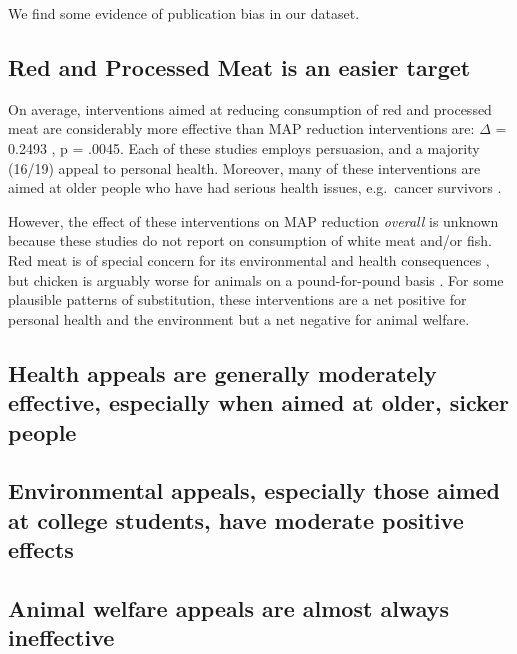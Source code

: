 \documentclass[sn-nature,pdflatex]{sn-jnl}
\begin{document}
We find some evidence of publication bias in our dataset.

\subsection{Red and Processed Meat is an easier
target}\label{red-and-processed-meat-is-an-easier-target}

On average, interventions aimed at reducing consumption of red and
processed meat are considerably more effective than MAP reduction
interventions are: \(\Delta\) = 0.2493 , p = .0045.
Each of these studies employs persuasion, and a majority (16/19) appeal
to personal health. Moreover, many of these interventions are aimed at
older people who have had serious health issues, e.g.~cancer survivors
\citep{lee2018, james2015}.

However, the effect of these interventions on MAP reduction
\emph{overall} is unknown because these studies do not report on
consumption of white meat and/or fish. Red meat is of special concern
for its environmental and health consequences \citep{grummon2023}, but
chicken is arguably worse for animals on a pound-for-pound basis
\citep{mathur2022}. For some plausible patterns of substitution, these
interventions are a net positive for personal health and the environment
but a net negative for animal welfare.

\subsection{Health appeals are generally moderately effective,
especially when aimed at older, sicker
people}\label{health-appeals-are-generally-moderately-effective-especially-when-aimed-at-older-sicker-people}

\subsection{Environmental appeals, especially those aimed at college
students, have moderate positive
effects}\label{environmental-appeals-especially-those-aimed-at-college-students-have-moderate-positive-effects}

\subsection{Animal welfare appeals are almost always
ineffective}\label{animal-welfare-appeals-are-almost-always-ineffective}
\end{document}
